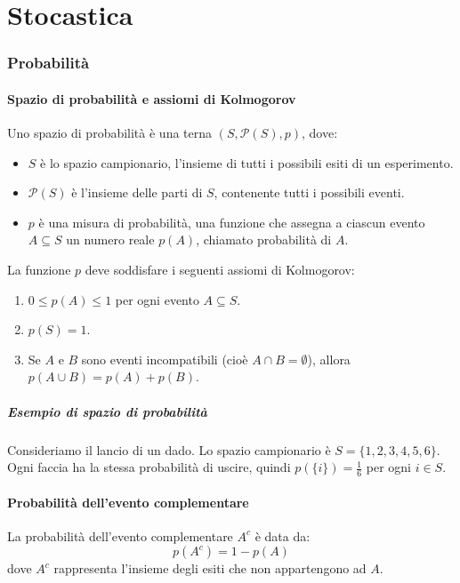 \documentclass{article}
\begin{document}
\newpage
\part{Stocastica}

\section{Probabilità}

\subsection{Spazio di probabilità e assiomi di Kolmogorov}
Uno spazio di probabilità è una terna \((S, \mathcal{P}(S), p)\), dove:
\begin{itemize}
    \item \(S\) è lo spazio campionario, l'insieme di tutti i possibili esiti di un esperimento.
    \item \(\mathcal{P}(S)\) è l'insieme delle parti di \(S\), contenente tutti i possibili eventi.
    \item \(p\) è una misura di probabilità, una funzione che assegna a ciascun evento \(A \subseteq S\) un numero reale \(p(A)\), chiamato probabilità di \(A\).
\end{itemize}
La funzione \(p\) deve soddisfare i seguenti assiomi di Kolmogorov:
\begin{enumerate}
    \item \(0 \leq p(A) \leq 1\) per ogni evento \(A \subseteq S\).
    \item \(p(S) = 1\).
    \item Se \(A\) e \(B\) sono eventi incompatibili (cioè \(A \cap B = \emptyset\)), allora \(p(A \cup B) = p(A) + p(B)\).
\end{enumerate}

\subsubsection{Esempio di spazio di probabilità}
Consideriamo il lancio di un dado. Lo spazio campionario è \(S = \{1, 2, 3, 4, 5, 6\}\). Ogni faccia ha la stessa probabilità di uscire, quindi \(p(\{i\}) = \frac{1}{6}\) per ogni \(i \in S\).

\newpage
\subsection{Probabilità dell’evento complementare}
La probabilità dell'evento complementare \(A^c\) è data da:
\[
p(A^c) = 1 - p(A)
\]
dove \(A^c\) rappresenta l'insieme degli esiti che non appartengono ad \(A\).
\end{document}
